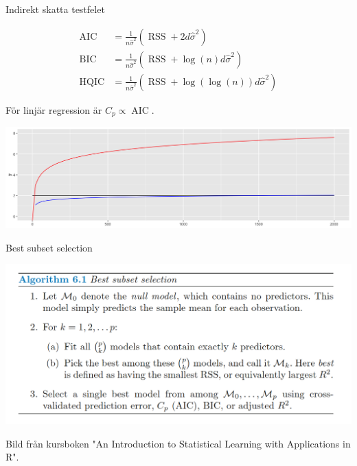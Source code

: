 \documentclass[10pt,english]{beamer}
\newenvironment{nscenter}
 {\parskip=0pt\par\nopagebreak\centering}
 {\par\noindent\ignorespacesafterend}
\begin{document}
\begin{frame}{Indirekt skatta testfelet}
    

    \begin{align*}
        \operatorname{AIC} &= \frac{1}{n \hat{\sigma}^2} (\operatorname{RSS} + 2 d \hat{\sigma}^2) \\
        \operatorname{BIC} &= \frac{1}{n \hat{\sigma}^2} (\operatorname{RSS} + \log(n) d \hat{\sigma}^2) \\
        \operatorname{HQIC} &= \frac{1}{n \hat{\sigma}^2} (\operatorname{RSS} + \log(\log(n)) d \hat{\sigma}^2)
    \end{align*}

    För linjär regression är $C_p \propto \operatorname{AIC}$.

    \includegraphics[width = \textwidth]{figs/logplot.png}

\end{frame}

\begin{frame}{Best subset selection}
    \begin{nscenter}
        \includegraphics[width=\textwidth]{figs/best subset selection.png}
    \end{nscenter}
    Bild från kursboken "An Introduction to Statistical Learning with Applications in R".

\end{frame}
\end{document}
